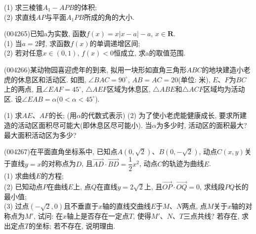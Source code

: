 (1) 求三棱锥$A_1-APB$的体积;\\
(2) 求直线$AP$与平面$A_1PB$所成的角的大小.
\item (004265)已知a为实数, 函数$f(x)=x|x-a|-a$, $x\in \mathbf{R}$.\\
(1) 当$a=2$时, 求函数$f(x)$的单调递增区间;\\
(2) 若对任意$x\in (0,1)$, $f(x)<0$恒成立, 求a的取值范围.
\item (004266)某动物园喜迎虎年的到来, 拟用一块形如直角三角形$ABC$的地块建造小老虎的休息区和活动区. 如图, $\angle BAC=90^\circ$, $AB=AC=20$(单位: 米), $E$、$F$为$BC$上的两点, 且$\angle EAF=45^\circ$, $\triangle AEF$区域为休息区, $\triangle ABE$和$\triangle ACF$区域均为活动区. 设$\angle EAB=\alpha$($0<\alpha <45^\circ$).
\begin{center}
\end{center}
(1) 求$AE$、$AF$的长; (用$\alpha$的代数式表示)
(2) 为了使小老虎能健康成长, 要求所建造的活动区面积尽可能大(即休息区尽可能小). 当$\alpha$为多少时, 活动区的面积最大? 最大面积活动区为多少?
\item (004267)在平面直角坐标系中, 已知点$A(0,\sqrt 2)$、$B(0,-\sqrt 2)$, 动点$C(x,y)$关于直线$y=x$的对称点为$D$, 且$\overrightarrow{AD}\cdot \overrightarrow{BD}=\dfrac 12{x^2}$, 动点$C$的轨迹为曲线$E$.\\
(1) 求曲线$E$的方程;\\
(2) 已知动点$P$在曲线$E$上, 点$Q$在直线$y=2\sqrt 2$上, 且$\overrightarrow{OP}\cdot \overrightarrow{OQ}=0$, 求线段$PQ$长的最小值;\\
(3) 过点$(-\sqrt 2,0)$且不垂直于$x$轴的直线交曲线$E$于$M$、$N$两点, 点$M$关于$x$轴的对称点为$M'$, 试问: 在$x$轴上是否存在一定点$T$, 使得$M'$、$N$、$T$三点共线? 若存在, 求出定点$T$的坐标; 若不存在, 说明理由.
